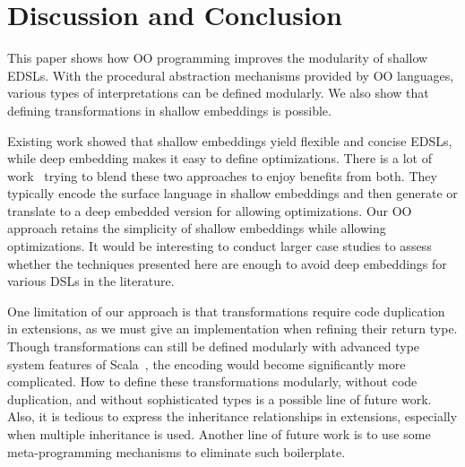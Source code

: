 \section{Discussion and Conclusion}
This paper shows how OO programming improves the modularity of shallow EDSLs.
With the procedural abstraction mechanisms provided by OO languages, various types of
interpretations can be defined modularly. We also show that defining
transformations in shallow embeddings is possible.


Existing work showed that shallow embeddings yield flexible and concise EDSLs, while deep embedding makes
it easy to define optimizations.
There is a lot of work~\cite{svenningsson2012combining,
  Jovanovic:2014:YCD:2658761.2658771, scherr2014implicit} trying to blend these two
approaches to enjoy benefits from both.
They typically encode the surface language in shallow embeddings and
then generate or translate to a deep embedded version for allowing optimizations.
Our OO approach retains the simplicity of shallow embeddings while
allowing optimizations. It would be interesting
to conduct larger case studies to assess whether the techniques
presented here are enough to avoid deep embeddings for various DSLs
in the literature.

One limitation of our approach is that
transformations require code duplication in extensions,
as we must give an implementation when refining their return type.
Though transformations can still be defined modularly with advanced type
system features of Scala~\cite{zenger05independentlyextensible},
the encoding would become significantly more complicated.
How to define these transformations modularly, without code
duplication, and without sophisticated types
is a possible line of future work.  Also, it is tedious to
express the inheritance relationships in extensions, especially when
multiple inheritance is used. Another line of future work is to use
some meta-programming mechanisms to eliminate such boilerplate.
